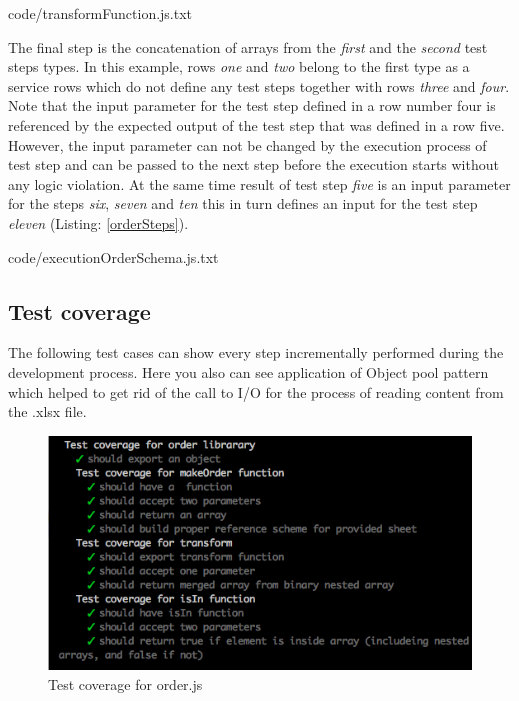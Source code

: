 
{code/transformFunction.js.txt}

The final step is the  concatenation of arrays from the \textit{first} and the \textit{second} test steps types. In this example, rows \textit{one} and \textit{two} belong to the first type as a service rows which do not define any test steps together with rows \textit{three} and \textit{four}. Note that the input parameter for the test step defined in a row number four is referenced by the expected output of the test step that was defined in a row five. However, the input parameter can not be changed by the execution process of test step and can be passed to the next step before the execution starts without any logic violation. At the same time result of test step \textit{five} is an input parameter for the steps \textit{six}, \textit{seven} and \textit{ten} this in turn defines an input for the test step \textit{eleven} (Listing: \ref{orderSteps}).

{code/executionOrderSchema.js.txt}


\subsection{Test coverage}

The following test cases can show every step incrementally performed during the development process. Here you also can see application of Object pool pattern which helped to get rid of the call to I/O for the process of reading content from the .xlsx file.
\begin{figure}[H]
	\centering
	\includegraphics[width=\linewidth]{grafiken/testOrder.png}
	\caption{Test coverage for order.js}
	\label{fig:testOrder}
\end{figure}

